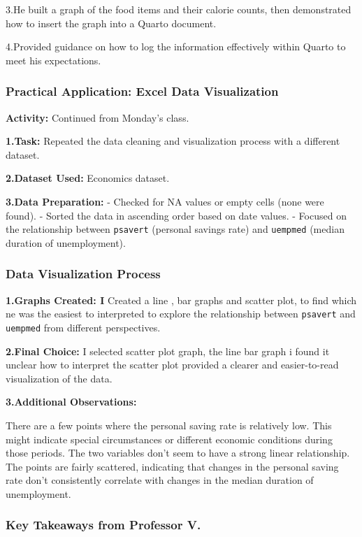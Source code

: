 \documentclass[
  letterpaper,
  DIV=11,
  numbers=noendperiod]{scrreprt}
\begin{document}
3.He built a graph of the food items and their calorie counts, then
demonstrated how to insert the graph into a Quarto document.

4.Provided guidance on how to log the information effectively within
Quarto to meet his expectations.

\subsubsection{Practical Application: Excel Data
Visualization}\label{practical-application-excel-data-visualization}

\textbf{Activity:} Continued from Monday's class.

\textbf{1.Task:} Repeated the data cleaning and visualization process
with a different dataset.

\textbf{2.Dataset Used:} Economics dataset.

\textbf{3.Data Preparation:} - Checked for NA values or empty cells
(none were found). - Sorted the data in ascending order based on date
values. - Focused on the relationship between \texttt{psavert} (personal
savings rate) and \texttt{uempmed} (median duration of unemployment).

\subsubsection{Data Visualization
Process}\label{data-visualization-process}

\textbf{1.Graphs Created: I} Created a line , bar graphs and scatter
plot, to find which ne was the easiest to interpreted to explore the
relationship between \texttt{psavert} and \texttt{uempmed} from
different perspectives.

\textbf{2.Final Choice:} I selected scatter plot graph, the line bar
graph i found it unclear how to interpret the scatter plot provided a
clearer and easier-to-read visualization of the data.

\textbf{3.Additional Observations:}

There are a few points where the personal saving rate is relatively low.
This might indicate special circumstances or different economic
conditions during those periods. The two variables don't seem to have a
strong linear relationship. The points are fairly scattered, indicating
that changes in the personal saving rate don't consistently correlate
with changes in the median duration of unemployment.

\subsubsection{Key Takeaways from Professor
V.}\label{key-takeaways-from-professor-v.}
\end{document}
